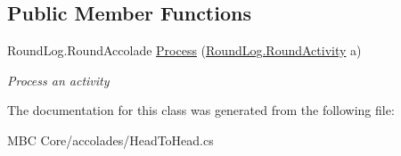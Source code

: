 \subsection*{Public Member Functions}
\begin{DoxyCompactItemize}
\item 
\hypertarget{class_m_b_c_1_1_core_1_1mbc_1_1accolades_1_1_head_to_head_abd8eabe255b8b53e059d4ac2a3f85598}{Round\-Log.\-Round\-Accolade \hyperlink{class_m_b_c_1_1_core_1_1mbc_1_1accolades_1_1_head_to_head_abd8eabe255b8b53e059d4ac2a3f85598}{Process} (\hyperlink{class_m_b_c_1_1_core_1_1_round_log_1_1_round_activity}{Round\-Log.\-Round\-Activity} a)}\label{class_m_b_c_1_1_core_1_1mbc_1_1accolades_1_1_head_to_head_abd8eabe255b8b53e059d4ac2a3f85598}

\begin{DoxyCompactList}\small\item\em Process an activity\end{DoxyCompactList}\end{DoxyCompactItemize}


The documentation for this class was generated from the following file\-:\begin{DoxyCompactItemize}
\item 
M\-B\-C Core/accolades/Head\-To\-Head.\-cs\end{DoxyCompactItemize}
